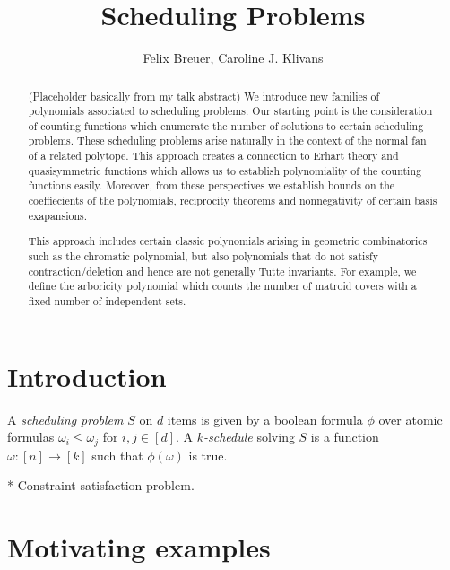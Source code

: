 \documentclass[12pt,reqno]{amsart}
\numberwithin{definition}{section}
\newcommand{\defn}[1]{\emph{#1}}
\begin{document}
\title{Scheduling Problems}
\author{Felix Breuer, Caroline J. Klivans}



\begin{abstract}{(Placeholder basically from my talk abstract) We introduce new families of polynomials associated to scheduling problems.  Our starting point is the consideration of counting functions which enumerate the number of solutions to certain scheduling problems.  These scheduling problems arise naturally in the context of the normal fan of a related polytope.  This approach creates a connection to Erhart theory and quasisymmetric functions which allows us to establish polynomiality of the counting functions easily. Moreover, from these perspectives we establish bounds on the coeffiecients of the polynomials, reciprocity theorems and nonnegativity of certain basis exapansions. 

This approach includes certain classic polynomials arising in geometric combinatorics such as the chromatic polynomial, but also polynomials that do not satisfy contraction/deletion and hence are not generally Tutte invariants.  For example, we define the arboricity polynomial which counts the number of matroid covers with a fixed number of independent sets.}
\end{abstract}
\maketitle


\tableofcontents

\section{Introduction}



A \defn{scheduling problem} $S$ on $d$ items is given by a boolean formula $\phi$ over atomic formulas $\omega_i\leq \omega_j$ for $i,j\in[d]$. A \defn{$k$-schedule} solving $S$ is a function $\omega:[n]\rightarrow[k]$ such that $\phi(\omega)$ is true.

* Constraint satisfaction problem.



\section{Motivating examples}

\end{document}
